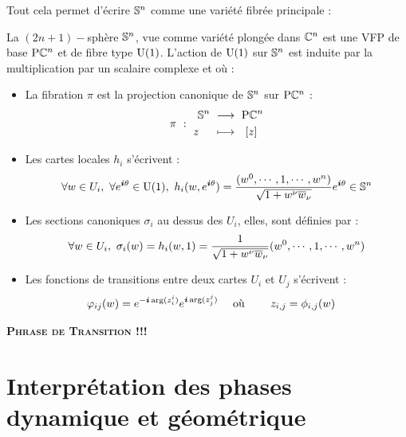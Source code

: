 Tout cela permet d'écrire $\S{n}$ comme une variété fibrée principale :
\begin{proposition}
	La $(2n+1)-$sphère $\S{n}$, vue comme variété plongée dans $\C^n$ est une VFP de base $\PC{n}$ et de fibre type $\U{1}$. L'action de $\U{1}$ sur $\S{n}$ est induite par la multiplication par un scalaire complexe et où :
	\begin{itemize}
		\item La fibration $\pi$ est la projection canonique de $\S{n}$ sur $\PC{n}$ :
		\begin{equation}
			\pi\ :\ \begin{aligned} \S{n}\ &\lr\ \PC{n} \\ z\quad\ &\lmt\ \ [z]\end{aligned}
		\end{equation}
		
		\item Les cartes locales $h_i$ s'écrivent :
		\begin{equation}
			\forall w \in U_i,\ \forall e^{\i \theta}\in\U{1},\  h_i(w,e^{\i \theta}) = \frac{(w^0,\cdots, 1,\cdots, w^n)}{\sqrt{1 + w^\nu \congu{w}_\nu}}e^{\i \theta} \in \S{n}
		\end{equation}
		
		\item Les sections canoniques $\sigma_i$ au dessus des $U_i$, elles,  sont définies par :
		\begin{equation}
			\forall w \in U_i,\ \sigma_i(w) = h_i(w, 1) = \frac{1}{\sqrt{1 + w^\nu \congu{w}_\nu}}(w^0,\cdots, 1,\cdots, w^n)
		\end{equation}
		
		\item Les fonctions de transitions entre deux cartes $U_i$ et $U_j$ s'écrivent :
		\begin{align}
			\varphi_{ij}(w) &= e^{-\i  \arg (z_i^i)} e^{\i  \arg (z_j^j)}  &  \text{ où }&\qquad z_{i,j} = \phi_{i,j}(w)
		\end{align}
	\end{itemize}
\end{proposition}
\skipl

\textbf{\textsc{\color{red}Phrase de Transition !!!}}



\section{Interprétation des phases dynamique et géométrique}

